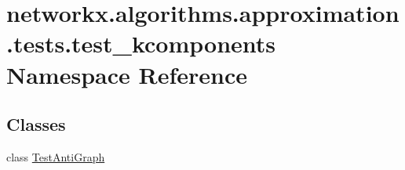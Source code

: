 \hypertarget{namespacenetworkx_1_1algorithms_1_1approximation_1_1tests_1_1test__kcomponents}{}\section{networkx.\+algorithms.\+approximation.\+tests.\+test\+\_\+kcomponents Namespace Reference}
\label{namespacenetworkx_1_1algorithms_1_1approximation_1_1tests_1_1test__kcomponents}
\subsection*{Classes}
\begin{DoxyCompactItemize}
\item 
class \hyperlink{classnetworkx_1_1algorithms_1_1approximation_1_1tests_1_1test__kcomponents_1_1TestAntiGraph}{Test\+Anti\+Graph}
\end{DoxyCompactItemize}
